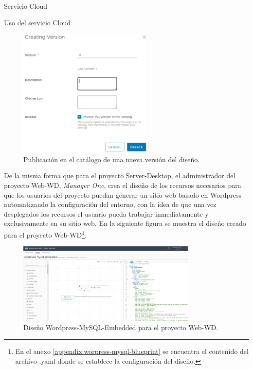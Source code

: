 \begin{subsection}{Servicio Cloud}
\begin{subsubsection}{Uso del servicio Cloud}
        \begin{figure}[h]
            \centering
            \includegraphics[width=0.6\textwidth]{imaxes/pruebaconcepto/vrealize/create-version-blueprint.png}
            \caption{Publicación en el catálogo de una nueva versión del diseño.}
            \label{fig:publication-version}
        \end{figure}
        \FloatBarrier
        De la misma forma que para el proyecto Server-Desktop, el administrador del proyecto Web-WD, \textit{Manager One}, crea el diseño de los recursos necesarios para que los usuarios del proyecto puedan generar un sitio web basado en Wordpress automatizando la configuración del entorno, con la idea de que una vez desplegados los recursos el usuario pueda trabajar inmediatamente y exclusivamente en su sitio web. En la siguiente figura se muestra el diseño creado para el proyecto Web-WD\footnote{En el anexo \ref{appendix:worpress-mysql-blueprint} se encuentra el contenido del archivo .yaml donde se establece la configuración del diseño.}.
        \begin{figure}[h]
            \centering
            \includegraphics[width=0.8\textwidth]{imaxes/pruebaconcepto/vrealize/wordpress-mysql-blueprint.png}
            \caption{Diseño Wordpress-MySQL-Embedded para el proyecto Web-WD.}
            \label{fig:web-WD-blueprint}
        \end{figure}

\end{subsubsection}
\end{subsection}
